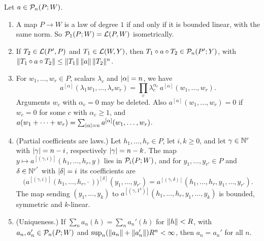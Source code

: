 \begin{lemma}\label{dp:lem:elementary}
Let $a\in\mathcal P_n(P;W)$.
\begin{enumerate}
\item A map $P\to W$ is a law of degree $1$ if and only if it is bounded linear, with the same norm. So $\mathcal P_1(P;W)=\mathcal L(P,W)$ isometrically.
\item If $T_2\in\mathcal L(P',P)$ and $T_1\in\mathcal L(W,Y)$, then $T_1\circ a\circ T_2\in\mathcal P_n(P';Y)$, with $\lVert T_1\circ a\circ T_2\rVert\le\lVert T_1\rVert\,\lVert a\rVert\,\lVert T_2\rVert^n$.
\item For $w_1,\dots,w_r\in P$, scalars $\lambda_c$ and $\lvert \alpha\rvert=n$, we have
\[
 a^{[\alpha]}(\lambda_1w_1,\dots,\lambda_rw_r)=\prod_c\lambda_c^{\alpha_c}\,a^{[\alpha]}(w_1,\dots,w_r).
\]
Arguments $w_c$ with $\alpha_c=0$ may be deleted. Also $a^{[\alpha]}(w_1,\dots,w_r)=0$ if $w_c=0$ for some $c$ with $\alpha_c\ge1$, and $a(w_1+\dots+w_r)=\sum_{\lvert \alpha\rvert=n}a^{[\alpha]}(w_1,\dots,w_r)$.
\item (Partial coefficients are laws.) Let $h_1,\dots,h_r\in P$, let $i,k\ge0$, and let $\gamma\in\mathbb N^r$ with $\lvert \gamma\rvert=n-i$, respectively $\lvert \gamma\rvert=n-k$. The map $y\mapsto a^{[(\gamma,i)]}(h_1,\dots,h_r,y)$ lies in $\mathcal P_i(P;W)$, and for $y_1,\dots,y_{r'}\in P$ and $\delta\in\mathbb N^{r'}$ with $\lvert \delta\rvert=i$ its coefficients are
\begin{equation}\label{dp:laws:partial}
 \bigl(a^{[(\gamma,i)]}(h_1,\dots,h_r,\cdot\,)\bigr)^{[\delta]}(y_1,\dots,y_{r'})=a^{[(\gamma,\delta)]}(h_1,\dots,h_r,y_1,\dots,y_{r'}).
\end{equation}
The map sending $(y_1,\dots,y_k)$ to $a^{[(\gamma,1^k)]}(h_1,\dots,h_r,y_1,\dots,y_k)$ is bounded, symmetric and $k$\nobreakdash-linear.
\item (Uniqueness.) If $\sum_na_n(h)=\sum_na_n'(h)$ for $\lVert h\rVert<R$, with $a_n,a_n'\in\mathcal P_n(P;W)$ and $\sup_n(\lVert a_n\rVert+\lVert a_n'\rVert)R^n<\infty$, then $a_n=a_n'$ for all $n$.
\end{enumerate}
\end{lemma}

